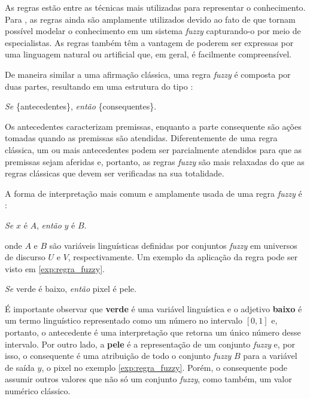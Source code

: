 As regras estão entre as técnicas mais utilizadas para representar o conhecimento. Para \citet{zimmermann:01}, as regras ainda são amplamente utilizados devido ao fato de que tornam possível modelar o conhecimento em um sistema \emph{fuzzy} capturando-o por meio de especialistas. As regras também têm a vantagem de poderem ser expressas por uma linguagem natural ou artificial que, em geral, é facilmente compreensível.

De maneira similar a uma afirmação clássica, uma regra \emph{fuzzy} é composta por duas partes, resultando em uma estrutura do tipo \citep{dubois:96}:
\begin{center}
\emph{Se} \{antecedentes\}, \emph{então} \{consequentes\}.
\end{center}

Os antecedentes caracterizam premissas, enquanto a parte consequente são ações tomadas quando as premissas são atendidas. Diferentemente de uma regra clássica, um ou mais antecedentes podem ser parcialmente atendidos para que as premissas sejam aferidas e, portanto, as regras \emph{fuzzy} são mais relaxadas do que as regras clássicas que devem ser verificadas na sua totalidade.

A forma de interpretação mais comum e amplamente usada de uma regra \emph{fuzzy} é \citep{dubois:96}:
\begin{center}
\emph{Se} $x$ é $A$, \emph{então} $y$ é $B$.
\end{center}
\noindent onde $A$ e $B$ são variáveis linguísticas definidas por conjuntos \emph{fuzzy} em universos de discurso $U$ e $V$, respectivamente. Um exemplo da aplicação da regra pode ser visto em \ref{exp:regra_fuzzy}.

\begin{exmp}
\label{exp:regra_fuzzy}
\emph{Se} verde é baixo, \emph{então} pixel é pele.
\end{exmp}

É importante observar que \textbf{verde} é uma variável linguística e o adjetivo \textbf{baixo} é um termo linguístico representado como um número no intervalo $[0, 1]$ e, portanto, o antecedente é uma interpretação que retorna um único número desse intervalo. Por outro lado, a \textbf{pele} é a representação de um conjunto \emph{fuzzy} e, por isso, o consequente é uma atribuição de todo o conjunto \emph{fuzzy} $B$ para a variável de saída $y$, o pixel no exemplo \ref{exp:regra_fuzzy}. Porém, o consequente pode assumir outros valores que não só um conjunto \emph{fuzzy}, como também, um valor numérico clássico.


